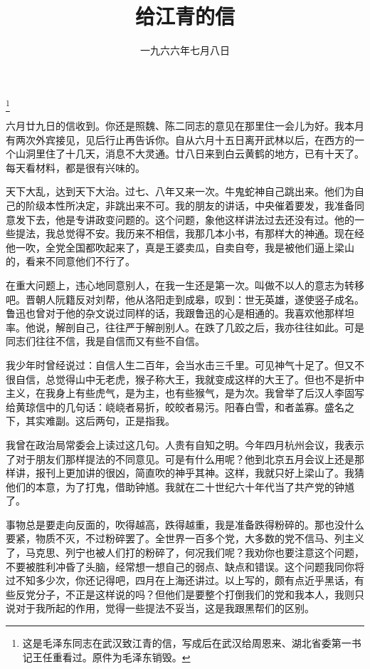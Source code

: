 
\title{给江青的信}
\date{一九六六年七月八日}
\thanks{这是毛泽东同志在武汉致江青的信，写成后在武汉给周恩来、湖北省委第一书记王任重看过。原件为毛泽东销毁。}
\maketitle



六月廿九日的信收到。你还是照魏、陈二同志的意见在那里住一会儿为好。我本月有两次外宾接见，见后行止再告诉你。自从六月十五日离开武林以后，在西方的一个山洞里住了十几天，消息不大灵通。廿八日来到白云黄鹤的地方，已有十天了。每天看材料，都是很有兴味的。

天下大乱，达到天下大治。过七、八年又来一次。牛鬼蛇神自己跳出来。他们为自己的阶级本性所决定，非跳出来不可。我的朋友的讲话，中央催着要发，我准备同意发下去，他是专讲政变问题的。这个问题，象他这样讲法过去还没有过。他的一些提法，我总觉得不安。我历来不相信，我那几本小书，有那样大的神通。现在经他一吹，全党全国都吹起来了，真是王婆卖瓜，自卖自夸，我是被他们逼上梁山的，看来不同意他们不行了。

在重大问题上，违心地同意别人，在我一生还是第一次。叫做不以人的意志为转移吧。晋朝人阮籍反对刘帮，他从洛阳走到成皋，叹到：世无英雄，遂使竖子成名。鲁迅也曾对于他的杂文说过同样的话，我跟鲁迅的心是相通的。我喜欢他那样坦率。他说，解剖自己，往往严于解剖别人。在跌了几跤之后，我亦往往如此。可是同志们往往不信，我是自信而又有些不自信。

我少年时曾经说过：自信人生二百年，会当水击三千里。可见神气十足了。但又不很自信，总觉得山中无老虎，猴子称大王，我就变成这样的大王了。但也不是折中主义，在我身上有些虎气，是为主，也有些猴气，是为次。我曾举了后汉人李固写给黄琼信中的几句话：峣峣者易折，皎皎者易污。阳春白雪，和者盖寡。盛名之下，其实难副。这后两句，正是指我。

我曾在政治局常委会上读过这几句。人贵有自知之明。今年四月杭州会议，我表示了对于朋友们那样提法的不同意见。可是有什么用呢？他到北京五月会议上还是那样讲，报刊上更加讲的很凶，简直吹的神乎其神。这样，我就只好上梁山了。我猜他们的本意，为了打鬼，借助钟馗。我就在二十世纪六十年代当了共产党的钟馗了。

事物总是要走向反面的，吹得越高，跌得越重，我是准备跌得粉碎的。那也没什么要紧，物质不灭，不过粉碎罢了。全世界一百多个党，大多数的党不信马、列主义了，马克思、列宁也被人们打的粉碎了，何况我们呢？我劝你也要注意这个问题，不要被胜利冲昏了头脑，经常想一想自己的弱点、缺点和错误。这个问题我同你将过不知多少次，你还记得吧，四月在上海还讲过。以上写的，颇有点近乎黑话，有些反党分子，不正是这样说的吗？但他们是要整个打倒我们的党和我本人，我则只说对于我所起的作用，觉得一些提法不妥当，这是我跟黑帮们的区别。

